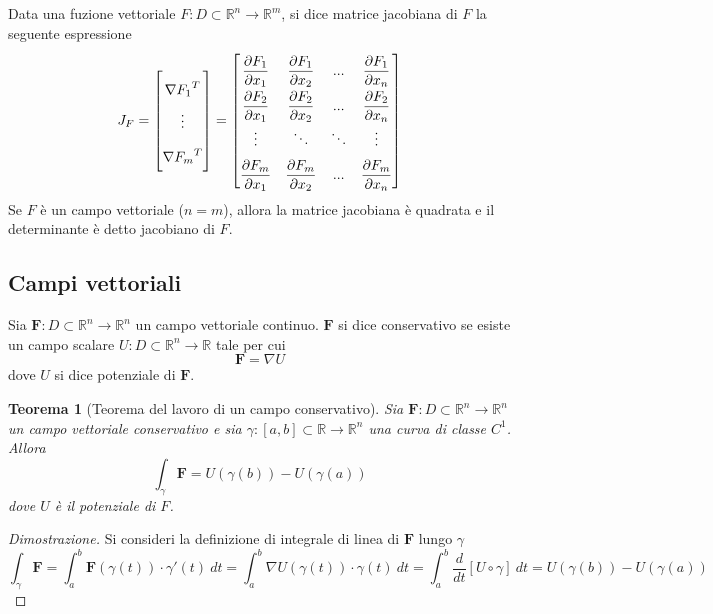 \documentclass{article}
\newtheorem{theorem}{Teorema}
\newcommand{\mfrac}[2]{\displaystyle\frac{#1}{#2}}
\begin{document}
            Data una fuzione vettoriale $F: D \subset \mathbb{R}^{n} \rightarrow \mathbb{R}^{m}$, si dice matrice jacobiana di $F$ la seguente espressione
            \[
                J_{F} = 
                \begin{bmatrix}
                    {\nabla F_{1}}^{T} \\
                    \vdots \\
                    {\nabla F_{m}}^{T} 
                \end{bmatrix} 
                = 
                \renewcommand{\arraystretch}{2}
                \begin{bmatrix}
                    \mfrac{\partial F_{1}}{\partial x_1} & \mfrac{\partial F_{1}}{\partial x_2} & ... & \mfrac{\partial F_{1}}{\partial x_n} \\
                    \mfrac{\partial F_{2}}{\partial x_1} & \mfrac{\partial F_{2}}{\partial x_2} & ... & \mfrac{\partial F_{2}}{\partial x_n} \\
                    \vdots & \ddots & \ddots & \vdots \\
                    \mfrac{\partial F_{m}}{\partial x_1} & \mfrac{\partial F_{m}}{\partial x_2} & ... & \mfrac{\partial F_{m}}{\partial x_n} \\
                \end{bmatrix}
            \]
            Se $F$ è un campo vettoriale ($n = m$), allora la matrice jacobiana è quadrata e il determinante è detto jacobiano di $F$.

        \newpage
        \subsection{Campi vettoriali}
            Sia $\mathbf{F}: D \subset \mathbb{R}^{n} \rightarrow \mathbb{R}^{n}$ un campo vettoriale continuo. $\mathbf{F}$ si dice conservativo se esiste un campo scalare $U: D \subset \mathbb{R}^{n} \rightarrow \mathbb{R}$ tale per cui 
            \[
                \mathbf{F} = \nabla U
            \]
            dove $U$ si dice potenziale di $\mathbf{F}$.


            \begin{theorem}[Teorema del lavoro di un campo conservativo]
                Sia $\mathbf{F}: D \subset \mathbb{R}^{n} \rightarrow \mathbb{R}^{n}$ un campo vettoriale conservativo e sia $\gamma: [a, b] \subset \mathbb{R} \rightarrow \mathbb{R}^{n}$ una curva di classe $C^{1}$.
                Allora
                \[
                        \int_{\gamma} \mathbf{F} = U(\gamma(b)) - U(\gamma(a))
                \]
                dove $U$ è il potenziale di $F$.
            \end{theorem}
            \begin{proof}[Dimostrazione]
                Si consideri la definizione di integrale di linea di $\mathbf{F}$ lungo $\gamma$
                \[
                    \int_{\gamma} \mathbf{F} = \int_{a}^{b} \mathbf{F}(\gamma(t)) \cdot \gamma'(t) \: dt = \int_{a}^{b} \nabla U(\gamma(t)) \cdot \gamma(t) \: dt = \int_{a}^{b} \frac{d}{dt}\left[ U \circ \gamma \right] \: dt = U(\gamma(b)) - U(\gamma(a))
                \]
            \end{proof}
\end{document}
